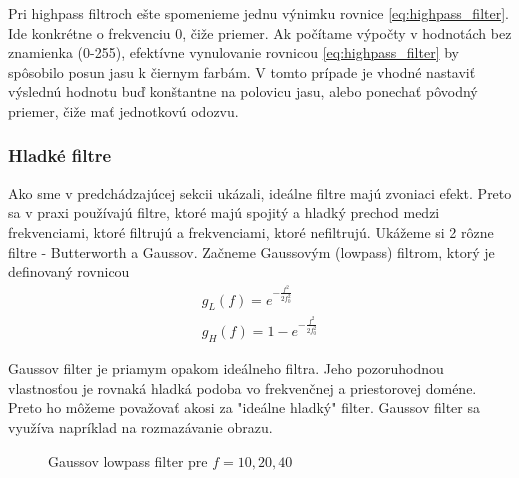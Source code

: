Pri highpass filtroch ešte spomenieme jednu výnimku rovnice
\ref{eq:highpass_filter}. Ide konkrétne o frekvenciu 0, čiže priemer.
Ak počítame výpočty v hodnotách bez znamienka (0-255), efektívne
vynulovanie rovnicou \ref{eq:highpass_filter} by spôsobilo posun jasu
k čiernym farbám. V tomto prípade je vhodné nastaviť výslednú hodnotu
buď konštantne na polovicu jasu, alebo ponechať pôvodný priemer, čiže
mať jednotkovú odozvu.

\subsubsection{Hladké filtre}
Ako sme v predchádzajúcej sekcii ukázali, ideálne filtre majú zvoniaci
efekt. Preto sa v praxi používajú filtre, ktoré majú spojitý a hladký
prechod medzi frekvenciami, ktoré filtrujú a frekvenciami, ktoré
nefiltrujú. Ukážeme si 2 rôzne filtre - Butterworth a Gaussov.
Začneme Gaussovým (lowpass) filtrom, ktorý je definovaný rovnicou
\begin{eqnarray}
g_L(f) = e^{- \frac{f^2}{2 f_0^2}} \\
g_H(f) = 1 - e^{- \frac{f^2}{2 f_0^2}}
\end{eqnarray}

Gaussov filter je priamym opakom ideálneho filtra. Jeho pozoruhodnou
vlastnosťou je rovnaká hladká podoba vo frekvenčnej a priestorovej doméne.
Preto ho môžeme považovať akosi za "ideálne hladký" filter. Gaussov
filter sa využíva napríklad na rozmazávanie obrazu.

\begin{figure}[htp]
    \def\path{obrazky/informatika/digitalne_filtre}
    \centering
    \caption{Gaussov lowpass filter pre $f=10,20,40$}
    \label{fig:gauss_lowpass_filter}
\end{figure}

